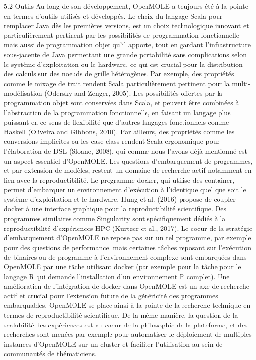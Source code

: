 \documentclass[10pt]{article}
\begin{document}
5.2 Outils
Au long de son développement, OpenMOLE a toujours été à la pointe en termes d’outils utilisés et développés. Le choix du langage Scala pour remplacer Java dès les premières versions, est un choix technologique innovant et particulièrement pertinent par les possibilités de programmation fonctionnelle mais aussi de programmation objet qu’il apporte, tout en gardant l’infrastructure sous-jacente de Java permettant une grande portabilité sans complications selon le système d’exploitation ou le hardware, ce qui est crucial pour la distribution des calculs sur des noeuds de grille hétérogènes. Par exemple, des propriétés comme le mixage de trait rendent Scala particulièrement pertinent pour la multi-modélisation (Odersky and Zenger, 2005). Les possibilités offertes par la programmation objet sont conservées dans Scala, et peuvent être combinées à l’abstraction de la programmation fonctionnelle, en faisant un langage plus puissant en ce sens de flexibilité que d’autres langages fonctionnels comme Haskell (Oliveira and Gibbons, 2010). Par ailleurs, des propriétés comme les conversions implicites ou les case class rendent Scala ergonomique pour l'élaboration de DSL (Sloane, 2008), qui comme nous l’avons déjà mentionné est un aspect essentiel d’OpenMOLE.
Les questions d’embarquement de programmes, et par extension de modèles, restent un domaine de recherche actif notamment en lien avec la reproductibilité. Le programme docker, qui utilise des container, permet d’embarquer un environnement d'exécution à l’identique quel que soit le système d’exploitation et le hardware. Hung et al. (2016) propose de coupler docker à une interface graphique pour la reproductibilité scientifique. Des programmes similaires comme Singularity sont spécifiquement dédiés à la reproductibilité d'expériences HPC (Kurtzer et al., 2017). Le coeur de la stratégie d’embarquement d’OpenMOLE ne repose pas sur un tel programme, par exemple pour des questions de performance, mais certaines tâches reposant sur l'exécution de binaires ou de programme à l’environnement complexe sont embarquées dans OpenMOLE par une tâche utilisant docker (par exemple pour la tâche pour le langage R qui demande l’installation d’un environnement R complet). Une amélioration de l'intégration de docker dans OpenMOLE est un axe de recherche actif et crucial pour l’extension future de la généricité des programmes embarquables. OpenMOLE se place ainsi à la pointe de la recherche technique en termes de reproductibilité scientifique. De la même manière, la question de la scalabilité des expériences est au coeur de la philosophie de la plateforme, et des recherches sont menées par exemple pour automatiser le déploiement de multiples instances d’OpenMOLE sur un cluster et faciliter l’utilisation au sein de communautés de thématiciens.
\end{document}
